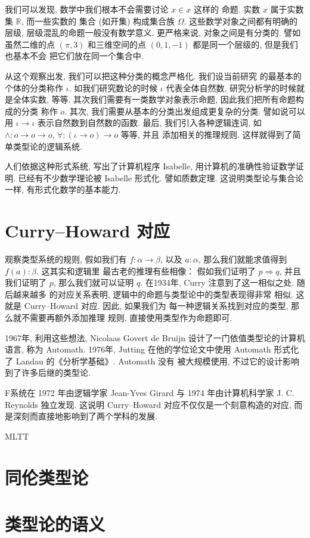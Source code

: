 \documentclass[UTF8, zihao=-4]{ctexart}
\theoremstyle{plain}
\theoremstyle{definition}
\theoremstyle{remark}
\begin{document}
我们可以发现, 数学中我们根本不会需要讨论 \(x \in x\) 这样的
命题. 实数 \(x\) 属于实数集 \(\mathbb R\), 而一些实数的
集合 (如开集) 构成集合族 \(\Omega\). 这些数学对象之间都有明确的层级,
层级混乱的命题一般没有数学意义.
更严格来说, 对象之间是有分类的. 譬如虽然二维的点 \((\pi, 3)\)
和三维空间的点 \((0,1,-1)\) 都是同一个层级的, 但是我们也基本不会
把它们放在同一个集合中.

从这个观察出发, 我们可以把这种分类的概念严格化. 我们设当前研究
的最基本的个体的分类称作 \(\iota\). 如我们研究数论的时候
\(\iota\) 代表全体自然数, 研究分析学的时候就是全体实数, 等等.
其次我们需要有一类数学对象表示命题, 因此我们把所有命题构成的分类
称作 \(o\).
其次, 我们需要从基本的分类出发组成更复杂的分类. 譬如说可以用
\(\iota \to \iota\) 表示自然数到自然数的函数.
最后, 我们引入各种逻辑连词, 如 \(\wedge : o \to o \to o\),
\(\forall : (\iota \to o) \to o\)  等等, 并且
添加相关的推理规则. 这样就得到了简单类型论的逻辑系统.

人们依据这种形式系统, 写出了计算机程序 Isabelle,
用计算机的准确性验证数学证明. 已经有不少数学理论被 Isabelle 形式化.
譬如质数定理. 这说明类型论与集合论一样, 有形式化数学的基本能力.

\section{Curry--Howard 对应}
观察类型系统的规则,
假如我们有 \(f : \alpha \to \beta\), 以及 \(a : \alpha\),
那么我们就能求值得到 \(f(a) : \beta\). 这其实和逻辑里
最古老的推理有些相像： 假如我们证明了 \(p\Rightarrow q\),
并且我们证明了 \(p\), 那么我们就可以证明 \(q\).
在1934年, Curry 注意到了这一相似之处. 随后越来越多
的对应关系表明, 逻辑中的命题与类型论中的类型表现得非常
相似. 这就是 Curry--Howard 对应. 因此, 如果我们为
每一种逻辑关系找到对应的类型, 那么就不需要再额外添加推理
规则, 直接使用类型作为命题即可.

1967年, 利用这些想法, Nicolaas Govert de Bruijn
设计了一门依值类型论的计算机语言, 称为 Automath.
1976年, Jutting 在他的学位论文中使用 Automath
形式化了 Landau 的《分析学基础》. Automath 没有
被大规模使用, 不过它的设计影响到了许多后继的类型论.

F系统在 1972 年由逻辑学家 Jean-Yves Girard
与 1974 年由计算机科学家 J. C. Reynolds 独立发现.
这说明 Curry--Howard 对应不仅仅是一个刻意构造的对应,
而是深刻而直接地影响到了两个学科的发展.

MLTT

\section{同伦类型论}

\section{类型论的语义}
\end{document}
